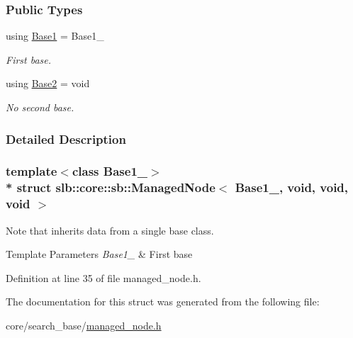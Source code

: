 \subsubsection*{Public Types}
\begin{DoxyCompactItemize}
\item 
using \hyperlink{structslb_1_1core_1_1sb_1_1ManagedNode_3_01Base1___00_01void_00_01void_00_01void_01_4_ae322a3517f0fb19071a9ed384ffdccac}{Base1} = Base1\+\_\+\hypertarget{structslb_1_1core_1_1sb_1_1ManagedNode_3_01Base1___00_01void_00_01void_00_01void_01_4_ae322a3517f0fb19071a9ed384ffdccac}{}\label{structslb_1_1core_1_1sb_1_1ManagedNode_3_01Base1___00_01void_00_01void_00_01void_01_4_ae322a3517f0fb19071a9ed384ffdccac}

\begin{DoxyCompactList}\small\item\em First base. \end{DoxyCompactList}\item 
using \hyperlink{structslb_1_1core_1_1sb_1_1ManagedNode_3_01Base1___00_01void_00_01void_00_01void_01_4_ab5372e9185cbcf468051128c266d0840}{Base2} = void\hypertarget{structslb_1_1core_1_1sb_1_1ManagedNode_3_01Base1___00_01void_00_01void_00_01void_01_4_ab5372e9185cbcf468051128c266d0840}{}\label{structslb_1_1core_1_1sb_1_1ManagedNode_3_01Base1___00_01void_00_01void_00_01void_01_4_ab5372e9185cbcf468051128c266d0840}

\begin{DoxyCompactList}\small\item\em No second base. \end{DoxyCompactList}\end{DoxyCompactItemize}


\subsubsection{Detailed Description}
\subsubsection*{template$<$class Base1\+\_\+$>$\\*
struct slb\+::core\+::sb\+::\+Managed\+Node$<$ Base1\+\_\+, void, void, void $>$}

Note that inherits data from a single base class. 


\begin{DoxyTemplParams}{Template Parameters}
{\em Base1\+\_\+} & First base \\
\hline
\end{DoxyTemplParams}


Definition at line 35 of file managed\+\_\+node.\+h.



The documentation for this struct was generated from the following file\+:\begin{DoxyCompactItemize}
\item 
core/search\+\_\+base/\hyperlink{managed__node_8h}{managed\+\_\+node.\+h}\end{DoxyCompactItemize}
